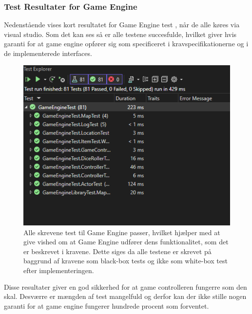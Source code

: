 \subsubsection{Test Resultater for Game Engine}
Nedenstående vises kort resultatet for Game Engine test \parencite[Section 12.2.3][]{TekniskBilag}, når de alle køres via visual
studio. Som det kan ses så er alle testene succesfulde, hvilket giver hvis garanti for at
game engine opfører sig som specificeret i kravspecifikationerne og i de implementerede interfaces.

\begin{figure}[H]
  \centering
  \includegraphics[scale=0.4]{02-body/Images/Test Results.png}
    \caption{Alle skrevene test til Game Engine passer, hvilket hjælper med at give vished
          om at Game Engine udfører dens funktionalitet, som det er beskrevet i kravene.
          Dette siges da alle testene er skrevet på baggrund af kravene som black-box tests
          og ikke som white-box test efter implementeringen.}
  \label{fig:TestResultsGameEngine}
\end{figure}

\noindent Disse resultater giver en god sikkerhed for at game controlleren fungerre som den skal. Desværre er 
mængden af test mangelfuld og derfor kan der ikke stille nogen garanti for at game engine fungerer hundrede procent
som forventet.

